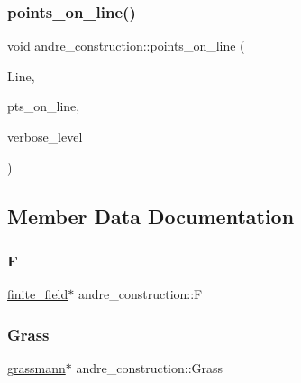 \mbox{\label{classandre__construction_a3a19d0f857a4d012abdf421adbf57a73}} 
\subsubsection{\texorpdfstring{points\+\_\+on\+\_\+line()}{points\_on\_line()}}
{\footnotesize\ttfamily void andre\+\_\+construction\+::points\+\_\+on\+\_\+line (\begin{DoxyParamCaption}\item[{\mbox{\hyperlink{classandre__construction__line__element}{andre\+\_\+construction\+\_\+line\+\_\+element}} $\ast$}]{Line,  }\item[{\mbox{\hyperlink{galois_8h_a09fddde158a3a20bd2dcadb609de11dc}{I\+NT}} $\ast$}]{pts\+\_\+on\+\_\+line,  }\item[{\mbox{\hyperlink{galois_8h_a09fddde158a3a20bd2dcadb609de11dc}{I\+NT}}}]{verbose\+\_\+level }\end{DoxyParamCaption})}



\subsection{Member Data Documentation}
\mbox{\label{classandre__construction_abb83384644c7629b70e6ea85a8f698c2}} 
\subsubsection{\texorpdfstring{F}{F}}
{\footnotesize\ttfamily \mbox{\hyperlink{classfinite__field}{finite\+\_\+field}}$\ast$ andre\+\_\+construction\+::F}

\mbox{\label{classandre__construction_a7525b1c772f87092e310e0c91d73acf3}} 
\subsubsection{\texorpdfstring{Grass}{Grass}}
{\footnotesize\ttfamily \mbox{\hyperlink{classgrassmann}{grassmann}}$\ast$ andre\+\_\+construction\+::\+Grass}

